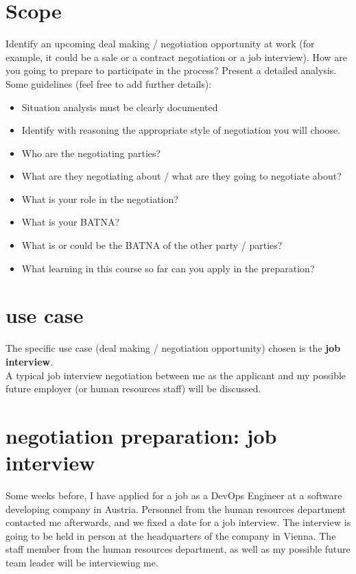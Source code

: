 \chapter{Scope}

Identify an upcoming deal making / negotiation opportunity at work (for example, it could be a sale or a contract negotiation or a job interview).
How are you going to prepare to participate in the process? Present a detailed analysis.
Some guidelines (feel free to add further details): \\

\begin{itemize}
	\item Situation analysis must be clearly documented
	\item Identify with reasoning the appropriate style of negotiation you will choose.
	\item Who are the negotiating parties?
	\item What are they negotiating about / what are they going to negotiate about?
	\item What is your role in the negotiation?
	\item What is your BATNA?
	\item What is or could be the BATNA of the other party / parties?
	\item What learning in this course so far can you apply in the preparation?
\end{itemize}



\chapter{use case}

The specific use case (deal making / negotiation opportunity) chosen is the \textbf{job interview}. \\

\noindent A typical job interview negotiation between me as the applicant and 
my possible future employer (or human resources staff) will be discussed. \\
 
\chapter{negotiation preparation: job interview}

Some weeks before, I have applied for a job as a DevOps Engineer at 
a software developing company in Austria. Personnel from the human resources department
contacted me afterwards, and we fixed a date for a job interview. The interview is going to
be held in person at the headquarters of the company in Vienna. The staff member
from the human resources department, as well as my possible future team leader
will be interviewing me. \\

